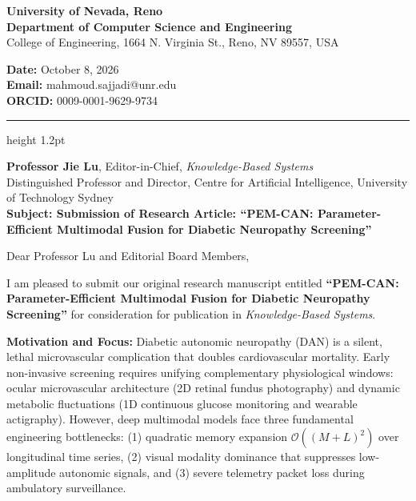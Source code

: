 \documentclass[10pt,letterpaper]{article}
\begin{document}
\pagestyle{empty}

\begin{minipage}[t]{0.70\textwidth}
    {\large \textbf{\color{unrblue}University of Nevada, Reno}}\\[1pt]
    {\normalsize \textbf{Department of Computer Science and Engineering}}\\[1pt]
    {\footnotesize College of Engineering, 1664 N. Virginia St., Reno, NV 89557, USA}
\end{minipage}
\hfill
\begin{minipage}[t]{0.28\textwidth}
    \raggedleft
    {\footnotesize \color{headergray}
    \textbf{Date:} October 8, 2026\\
    \textbf{Email:} mahmoud.sajjadi@unr.edu\\
    \textbf{ORCID:} 0009-0001-9629-9734
    }
\end{minipage}

\vspace{4pt}
{\color{unrblue}\hrule height 1.2pt}
\vspace{8pt}

\textbf{Professor Jie Lu}, Editor-in-Chief, \textit{Knowledge-Based Systems}\\
Distinguished Professor and Director, Centre for Artificial Intelligence, University of Technology Sydney\\[6pt]
\textbf{Subject: Submission of Research Article: ``PEM-CAN: Parameter-Efficient Multimodal Fusion for Diabetic Neuropathy Screening''}

Dear Professor Lu and Editorial Board Members,

I am pleased to submit our original research manuscript entitled \textbf{``PEM-CAN: Parameter-Efficient Multimodal Fusion for Diabetic Neuropathy Screening''} for consideration for publication in \textit{Knowledge-Based Systems}.

\textbf{Motivation and Focus:} Diabetic autonomic neuropathy (DAN) is a silent, lethal microvascular complication that doubles cardiovascular mortality. Early non-invasive screening requires unifying complementary physiological windows: ocular microvascular architecture (2D retinal fundus photography) and dynamic metabolic fluctuations (1D continuous glucose monitoring and wearable actigraphy). However, deep multimodal models face three fundamental engineering bottlenecks: (1) quadratic memory expansion $\mathcal{O}((M+L)^2)$ over longitudinal time series, (2) visual modality dominance that suppresses low-amplitude autonomic signals, and (3) severe telemetry packet loss during ambulatory surveillance.
\end{document}
